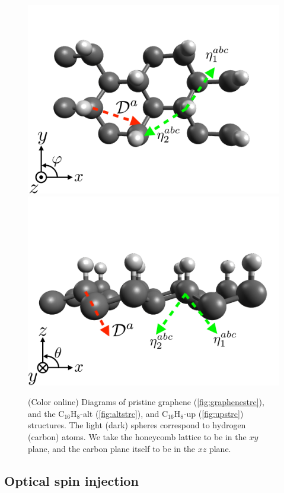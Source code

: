 \documentclass[pss]{wiley2sp} %
\begin{document}
\begin{figure}[t]
{\includegraphics[width=0.49\linewidth]{figures/images/up1}
\includegraphics[width=0.49\linewidth]{figures/images/up2}\label{fig:upstrc}}
\caption{(Color online) Diagrams of pristine graphene
(\ref{fig:graphenestrc}), and the C$_{16}$H$_{8}$-alt (\ref{fig:altstrc}), and
C$_{16}$H$_{8}$-up (\ref{fig:upstrc}) structures. The light (dark) spheres
correspond to hydrogen (carbon) atoms. We take the honeycomb lattice to be in
the $xy$ plane, and the carbon plane itself to be in the $xz$
plane.\label{fig:structures}}
\end{figure}



\subsection{Optical spin injection}
\end{document}
